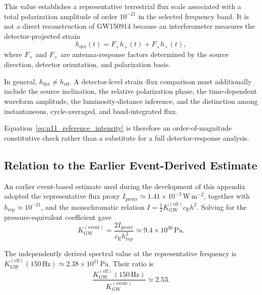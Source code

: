 This value establishes a representative terrestrial flux scale associated with a total polarization amplitude of order $10^{-21}$ in the selected frequency band. It is not a direct reconstruction of GW150914 because an interferometer measures the detector-projected strain
\begin{equation}
    h_{\mathrm{det}}(t) = F_{+}h_{+}(t) + F_{\times}h_{\times}(t),
    \label{eq:n11_detector_response}
\end{equation}
where $F_{+}$ and $F_{\times}$ are antenna-response factors determined by the source direction, detector orientation, and polarization basis.

In general, $h_{\mathrm{det}} \neq h_{\mathrm{eff}}$. A detector-level strain--flux comparison must additionally include the source inclination, the relative polarization phase, the time-dependent waveform amplitude, the luminosity-distance inference, and the distinction among instantaneous, cycle-averaged, and band-integrated flux.

Equation~\eqref{eq:n11_reference_intensity} is therefore an order-of-magnitude constitutive check rather than a substitute for a full detector-response analysis.

\subsection{Relation to the Earlier Event-Derived Estimate}
\label{subsec:n11_previous_event_estimate}

An earlier event-based estimate used during the development of this appendix adopted the representative flux proxy $I_{\mathrm{proxy}} \simeq 1.41\times10^{-3}\,\mathrm{W\,m^{-2}}$, together with $h_{\mathrm{rep}} \simeq 10^{-21}$, and the monochromatic relation $I = \frac{1}{2} K_{\mathrm{GW}}^{(\mathrm{eff})} c_{\mathrm{E}} h^{2}$. Solving for the pressure-equivalent coefficient gave
\begin{equation}
    K_{\mathrm{GW}}^{(\mathrm{event})} = \frac{ 2I_{\mathrm{proxy}} }{ c_{\mathrm{E}}h_{\mathrm{rep}}^{2} } \simeq 9.4\times10^{30}\,\mathrm{Pa}.
    \label{eq:n11_previous_event_stiffness}
\end{equation}

The independently derived spectral value at the representative frequency is $K_{\mathrm{GW}}^{(\mathrm{eff})} \left( 150\,\mathrm{Hz} \right) \simeq 2.38\times10^{31}\,\mathrm{Pa}$. Their ratio is
\begin{equation}
    \frac{ K_{\mathrm{GW}}^{(\mathrm{eff})} \left( 150\,\mathrm{Hz} \right) }{ K_{\mathrm{GW}}^{(\mathrm{event})} } \simeq 2.53.
    \label{eq:n11_stiffness_comparison_ratio}
\end{equation}

